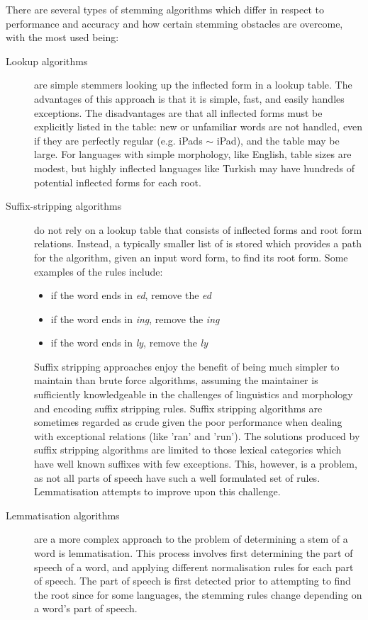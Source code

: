     There are several types of stemming algorithms which differ in respect to performance and accuracy and how certain stemming obstacles are overcome, with the most used being:
    \begin{description}
      \item[Lookup algorithms] are simple stemmers looking up the inflected form in a lookup table. The advantages of this approach is that it is simple, fast, and easily handles exceptions. The disadvantages are that all inflected forms must be explicitly listed in the table: new or unfamiliar words are not handled, even if they are perfectly regular (e.g. iPads $\sim$ iPad), and the table may be large. For languages with simple morphology, like English, table sizes are modest, but highly inflected languages like Turkish may have hundreds of potential inflected forms for each root.
      \item[Suffix-stripping algorithms] do not rely on a lookup table that consists of inflected forms and root form relations. Instead, a typically smaller list of  is stored which provides a path for the algorithm, given an input word form, to find its root form. Some examples of the rules include:
        \begin{itemize}
          \item if the word ends in \emph{ed}, remove the \emph{ed}
          \item if the word ends in \emph{ing}, remove the \emph{ing}
          \item if the word ends in \emph{ly}, remove the \emph{ly}
        \end{itemize}
        Suffix stripping approaches enjoy the benefit of being much simpler to maintain than brute force algorithms, assuming the maintainer is sufficiently knowledgeable in the challenges of linguistics and morphology and encoding suffix stripping rules. Suffix stripping algorithms are sometimes regarded as crude given the poor performance when dealing with exceptional relations (like 'ran' and 'run'). The solutions produced by suffix stripping algorithms are limited to those lexical categories which have well known suffixes with few exceptions. This, however, is a problem, as not all parts of speech have such a well formulated set of rules. Lemmatisation attempts to improve upon this challenge.       \item[Lemmatisation algorithms] are a more complex approach to the problem of determining a stem of a word is lemmatisation. This process involves first determining the part of speech of a word, and applying different normalisation rules for each part of speech. The part of speech is first detected prior to attempting to find the root since for some languages, the stemming rules change depending on a word's part of speech.


\end{description}
